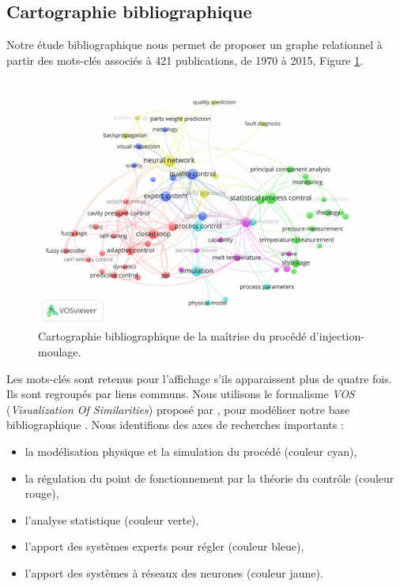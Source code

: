 
\FloatBarrier
\subsection{Cartographie bibliographique}
Notre étude bibliographique  \cite{nagorny_injection_2017} nous permet de proposer un graphe relationnel à partir des mots-clés associés à 421 publications, de 1970 à 2015, Figure \ref{fig:cartographie}.

\begin{figure}[hbtp]
	\centering
	\includegraphics[width=\textwidth,height=\textheight,keepaspectratio]{../Chap1/Figures/tagMapFinalPubliOccurence.jpg}
	\caption{Cartographie bibliographique de la maîtrise du procédé d'injection-moulage.}
	\label{fig:cartographie}
\end{figure}

Les mots-clés sont retenus pour l’affichage s’ils apparaissent plus de quatre fois.
Ils sont regroupés par liens communs.
Nous utilisons le formalisme \textit{VOS} (\textit{Visualization Of Similarities}) proposé par \citeauthor{vaneck_vos_2006}, pour modéliser notre base bibliographique \cite{vaneck_vos_2006, van_eck_comparison_2010}.
Nous identifions des axes de recherches importants :
\begin{itemize}
	\item la modélisation physique et la simulation du procédé (couleur cyan),
	\item la régulation du point de fonctionnement par la théorie du contrôle (couleur rouge),
	\item l’analyse statistique (couleur verte),
	\item l’apport des systèmes experts pour régler (couleur bleue),
	\item l’apport des systèmes à réseaux des neurones (couleur jaune).
\end{itemize}

